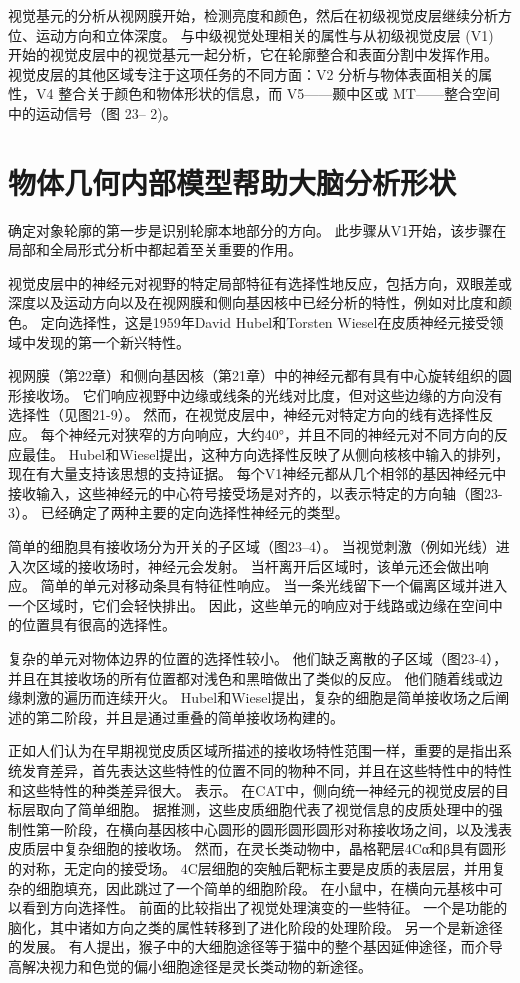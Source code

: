 视觉基元的分析从视网膜开始，检测亮度和颜色，然后在初级视觉皮层继续分析方位、运动方向和立体深度。 与中级视觉处理相关的属性与从初级视觉皮层 (V1) 开始的视觉皮层中的视觉基元一起分析，它在轮廓整合和表面分割中发挥作用。 视觉皮层的其他区域专注于这项任务的不同方面：V2 分析与物体表面相关的属性，V4 整合关于颜色和物体形状的信息，而 V5——颞中区或 MT——整合空间中的运动信号（图 23– 2)。

\section{物体几何内部模型帮助大脑分析形状}

确定对象轮廓的第一步是识别轮廓本地部分的方向。 此步骤从V1开始，该步骤在局部和全局形式分析中都起着至关重要的作用。

视觉皮层中的神经元对视野的特定局部特征有选择性地反应，包括方向，双眼差或深度以及运动方向以及在视网膜和侧向基因核中已经分析的特性，例如对比度和颜色。 定向选择性，这是1959年David Hubel和Torsten Wiesel在皮质神经元接受领域中发现的第一个新兴特性。

视网膜（第22章）和侧向基因核（第21章）中的神经元都有具有中心旋转组织的圆形接收场。 它们响应视野中边缘或线条的光线对比度，但对这些边缘的方向没有选择性（见图21-9）。 然而，在视觉皮层中，神经元对特定方向的线有选择性反应。 每个神经元对狭窄的方向响应，大约40°，并且不同的神经元对不同方向的反应最佳。 Hubel和Wiesel提出，这种方向选择性反映了从侧向核核中输入的排列，现在有大量支持该思想的支持证据。 每个V1神经元都从几个相邻的基因神经元中接收输入，这些神经元的中心符号接受场是对齐的，以表示特定的方向轴（图23-3）。 已经确定了两种主要的定向选择性神经元的类型。

简单的细胞具有接收场分为开关的子区域（图23–4）。 当视觉刺激（例如光线）进入次区域的接收场时，神经元会发射。 当杆离开后区域时，该单元还会做出响应。 简单的单元对移动条具有特征性响应。 当一条光线留下一个偏离区域并进入一个区域时，它们会轻快排出。 因此，这些单元的响应对于线路或边缘在空间中的位置具有很高的选择性。

复杂的单元对物体边界的位置的选择性较小。 他们缺乏离散的子区域（图23-4），并且在其接收场的所有位置都对浅色和黑暗做出了类似的反应。 他们随着线或边缘刺激的遍历而连续开火。 Hubel和Wiesel提出，复杂的细胞是简单接收场之后阐述的第二阶段，并且是通过重叠的简单接收场构建的。

正如人们认为在早期视觉皮质区域所描述的接收场特性范围一样，重要的是指出系统发育差异，首先表达这些特性的位置不同的物种不同，并且在这些特性中的特性和这些特性的种类差异很大。 表示。 在CAT中，侧向统一神经元的视觉皮层的目标层取向了简单细胞。 据推测，这些皮质细胞代表了视觉信息的皮质处理中的强制性第一阶段，在横向基因核中心圆形的圆形圆形圆形对称接收场之间，以及浅表皮质层中复杂细胞的接收场。 然而，在灵长类动物中，晶格靶层4Cα和β具有圆形的对称，无定向的接受场。 4C层细胞的突触后靶标主要是皮质的表层层，并用复杂的细胞填充，因此跳过了一个简单的细胞阶段。 在小鼠中，在横向元基核中可以看到方向选择性。 前面的比较指出了视觉处理演变的一些特征。 一个是功能的脑化，其中诸如方向之类的属性转移到了进化阶段的处理阶段。 另一个是新途径的发展。 有人提出，猴子中的大细胞途径等于猫中的整个基因延伸途径，而介导高解决视力和色觉的偏小细胞途径是灵长类动物的新途径。

